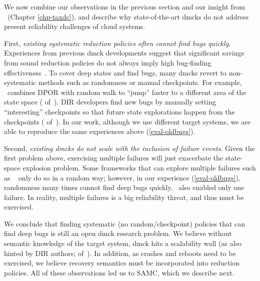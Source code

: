 We now combine our observations in the previous section and our insight from
\taxdc\ (Chapter \ref{chp-taxdc}), and describe why state-of-the-art dmcks do
not address present reliability challenges of cloud systems.

First, {\em existing systematic reduction policies often cannot find bugs
quickly}.  Experiences from previous dmck developments suggest that significant
savings from sound reduction policies do not always imply high bug-finding
effectiveness~\cite{Guo+11-Demeter, Yang+09-Modist}.  To cover deep states and
find bugs, many dmcks revert to non-systematic methods such as randomness or
manual checkpoints.  For example, \modist\ combines DPOR with random walk to
``jump'' faster to a different area of the state space (
of~\cite{Yang+09-Modist}).  DIR developers find new bugs by manually setting
``interesting'' checkpoints so that future state explorations happen from the
checkpoints ( of~\cite{Guo+11-Demeter}).  In our work, although we use
different target systems, we are able to reproduce the same experiences above
(\sec\ref{eval-oldbugs}).



Second, {\em existing dmcks do not scale with the inclusion of failure events}.
Given the first problem above, exercising multiple failures will just exacerbate
the state-space explosion problem.  Some frameworks that can explore multiple
failures such as \macemc~\cite{Killian+07-LifeDeathMaceMC} only do so in a
random way; however, in our experience (\sec\ref{eval-oldbugs}), randomness many
times cannot find deep bugs quickly.  \modist\ also enabled only one failure.
In reality, multiple failures is a big reliability threat, and thus must be
exercised.


We conclude that finding systematic (no random/checkpoint) policies that can
find deep bugs is still an open dmck research problem.  We believe without
semantic knowledge of the target system, dmck hits a scalability wall (as also
hinted by DIR authors;  of~\cite{Guo+11-Demeter}).  In addition, as crashes
and reboots need to be exercised, we believe recovery semantics must be
incorporated into reduction policies.  All of these observations led us to SAMC,
which we describe next.


